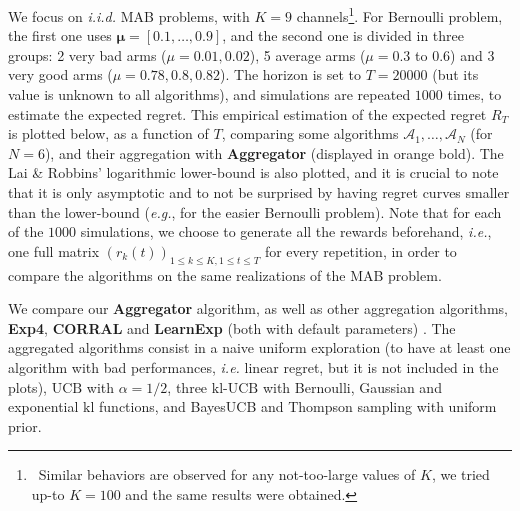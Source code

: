 \documentclass[conference]{IEEEtran}
\theoremstyle{plain}  %
\newcommand{\ie}{\emph{i.e.}}
\newcommand{\eg}{\emph{e.g.}}
\newcommand{\UCB}[0]{$\mathrm{UCB}$}
\newcommand{\kl}[0]{\ensuremath{\mathrm{kl}}}
\newcommand{\klUCB}[0]{$\mathrm{kl}$-$\mathrm{UCB}$}
\newcommand{\Aggr}[0]{\textbf{Aggregator}}
\newcommand{\ExpQ}[0]{\textbf{Exp4}}
\newcommand{\CORRAL}[0]{\textbf{CORRAL}}
\newcommand{\LearnExp}[0]{\textbf{LearnExp}}
\newcommand{\Alg}[0]{\mathcal{A}}
\begin{document}
We focus on \emph{i.i.d.} MAB problems, with $K = 9$ channels\footnote{~Similar behaviors are observed for any not-too-large values of $K$, we tried up-to $K = 100$ and the same results were obtained.}.
For Bernoulli problem, the first one uses $\boldsymbol{\mu}=[0.1,\dots,0.9]$,
and the second one is divided in three groups:
2 very bad arms ($\mu = 0.01, 0.02$), 5 average arms ($\mu = 0.3$ to $0.6$) and 3 very good arms ($\mu = 0.78, 0.8, 0.82$).
The horizon is set to $T = 20000$ (but its value is unknown to all algorithms), and simulations are repeated $1000$ times, to estimate the expected regret.
%
This empirical estimation of the expected regret $R_T$ is plotted below, as a function of $T$, comparing some algorithms $\Alg_1,\dots,\Alg_N$ (for $N=6$), and their aggregation with \Aggr{} (displayed in orange bold).
The Lai \& Robbins' logarithmic lower-bound \cite{LaiRobbins85} is also plotted, and it is crucial to note that it is only asymptotic and to not be surprised by having regret curves smaller than the lower-bound (\eg, for the easier Bernoulli problem).
%
Note that for each of the $1000$ simulations, we choose to generate all the rewards beforehand, \ie, one full matrix $(r_k(t))_{1\leq k \leq K, 1 \leq t \leq T}$ for every repetition, in order to compare the algorithms on the same realizations
of the MAB problem.

We compare our \Aggr{} algorithm, %
as well as other aggregation algorithms, \ExpQ{},
\CORRAL{} and \LearnExp{} (both with default parameters) \cite{Bubeck12,Agarwal16,Singla17}.
The aggregated algorithms consist in a naive uniform exploration (to have at least one algorithm with bad performances, \ie{} linear regret, but it is not included in the plots),
\UCB{} with $\alpha=1/2$, three \klUCB{} with Bernoulli, Gaussian and exponential $\kl$ functions, and BayesUCB and Thompson sampling with uniform prior.
\end{document}
